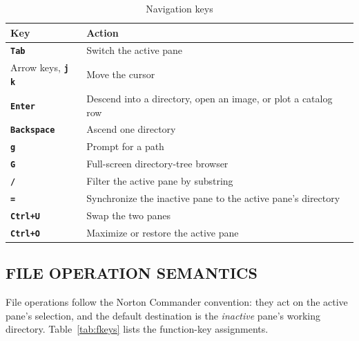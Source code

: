 \documentclass[tm]{ornltm}
\newcommand{\key}[1]{\textbf{\texttt{#1}}}
\begin{document}
\begin{table}[ht]
  \centering
  \caption{Navigation keys}
  \label{tab:nav}
  \small
  \begin{tabular}{l l}
    \toprule
    Key & Action \\
    \midrule
    \key{Tab} & Switch the active pane \\
    Arrow keys, \key{j} \key{k} & Move the cursor \\
    \key{Enter} & Descend into a directory, open an image, or plot a catalog
      row \\
    \key{Backspace} & Ascend one directory \\
    \key{g} & Prompt for a path \\
    \key{G} & Full-screen directory-tree browser \\
    \key{/} & Filter the active pane by substring \\
    \key{=} & Synchronize the inactive pane to the active pane's directory \\
    \key{Ctrl+U} & Swap the two panes \\
    \key{Ctrl+O} & Maximize or restore the active pane \\
    \bottomrule
  \end{tabular}
\end{table}

\subsection{FILE OPERATION SEMANTICS}

File operations follow the Norton Commander convention: they act on the active
pane's selection, and the default destination is the \emph{inactive} pane's
working directory. Table~\ref{tab:fkeys} lists the function-key assignments.
\end{document}
